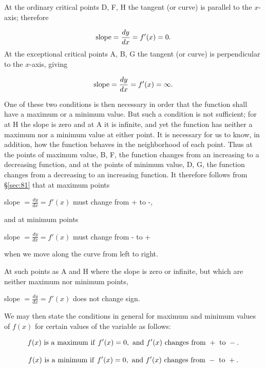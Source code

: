 At the ordinary critical %
points D, F, H the tangent (or curve) is parallel to the $x$-axis; 
therefore

\[
{\rm   slope} = \frac{dy}{dx} = f'(x) = 0.
\]
At the exceptional critical %
points A, B, G the tangent (or curve) is perpendicular to the $x$-axis, 
giving

\[
{\rm  slope} = \frac{dy}{dx} = f'(x) = \infty . 
\]

One of these two conditions is then necessary in order that 
the function shall have a maximum or a minimum value. But such 
a condition is not sufficient; for at H the slope is zero and 
at A it is infinite, and yet the function has neither a maximum nor a 
minimum value at either point. It is necessary for us to know, in 
addition, how the function behaves in the neighborhood of each point. 
Thus at the points of maximum value, B, F, the function 
changes from an increasing to a decreasing function, and at the 
points of minimum value, D, G, the function changes from a 
decreasing to an increasing function. It therefore follows from 
\S \ref{sec:81} %
that at maximum points

\begin{center}
    slope $= \frac{dy}{dx} = f'(x)$ must change from + to -,
\end{center}
and at minimum points

\begin{center}
    slope $= \frac{dy}{dx} = f'(x)$ must change from - to +
\end{center}
when we move along the curve from left to right.

At such points as A and H where the slope is zero or infinite, 
but which are neither maximum nor minimum points,

\begin{center}
    slope $= \frac{dy}{dx} = f'(x)$ does not change sign.
\end{center}
We may then state the conditions in general for maximum and minimum 
values of $f(x)$ for certain values of the variable as follows:

\begin{equation}
f(x) \ {\rm is\ a\ maximum\ if\ }f'(x) = 0, \ {\rm and}\ f'(x)\
{\rm changes\ from\ } +\ {\rm to}\ -.
\label{eqn:19-82}
\end{equation}

\begin{equation}
f(x)  \ {\rm is\ a\ minimum\ if}\ f'(x) = 0,\ {\rm and}\ f'(x)\ 
{\rm changes\ from}\ -\ {\rm to}\ +.
\label{eqn:20-82}
\end{equation}

